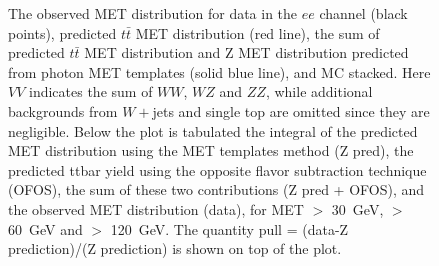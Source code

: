 \begin{figure}[hbtp]
\begin{center}
    \caption{
      The observed MET distribution for data in the $ee$ channel (black points),
      predicted $t\bar{t}$ MET distribution (red line), the sum of predicted $t\bar{t}$ MET distribution and
      Z  MET  distribution  predicted  from photon  MET  templates
      (solid blue line),  and MC stacked. Here $VV$  indicates the sum
      of  $WW$,  $WZ$  and  $ZZ$, while  additional  backgrounds  from
      $W+$jets   and   single  top   are   omitted   since  they   are
      negligible.  Below the  plot is  tabulated the  integral  of the
      predicted  MET distribution  using the  MET templates  method (Z
      pred),  the  predicted ttbar  yield  using  the opposite  flavor
      subtraction  technique (OFOS), the  sum of  these two
      contributions (Z pred + OFOS), and the observed MET distribution
      (data), for  MET $>$ 30~GeV,  $>$ 60~GeV and $>$  120~GeV. The
      quantity pull  = (data-Z prediction)/(Z prediction)  is shown on
      top  of the  plot.  
    }
    \label{fig:pfmet_ee}
  \end{center}
\end{figure}

